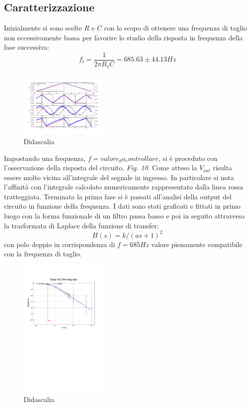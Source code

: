 \documentclass[journal]{IEEEtran}
\begin{document}
\subsection{\textbf{Caratterizzazione}}
Inizialmente si sono scelte $R$ e $C$ con lo scopo di ottenere una frequenza di taglio non eccessivamente bassa per favorire lo studio della risposta in frequenza della fase successiva: \[f_{t} = \frac{1}{2 \pi R_{1} C}= 685.63 \pm 44.13 Hz\] 

\begin{figure}[H]%
\begin {center}
\includegraphics[width=0.38\textwidth]{analysis/output/OPA-integ-with-res.pdf}
\caption{Didascalia}
\label{fig:oscilloscope}
\end {center}
\end{figure}
Impostando una frequenza, $f=valore_da _controllare$, si è proceduto con l'osservazione della risposta del circuito, \textit{Fig. 10}. Come atteso la $V_{out}$ risulta essere molto vicina all'integrale del segnale in ingresso. In particolare si nota l'affinità con l'integrale calcolato numericamente rappresentato dalla linea rossa tratteggiata.
Terminata la prima fase si è passati all'analisi della output del circuito in funzione della frequenza. I dati sono stati graficati e fittati in primo luogo con la forma funzionale di un filtro passa basso e poi in seguito attraverso la trasformata di Laplace della funzione di transfer: \[H(s)=k/(as+1)^2\] con polo doppio in corrispondenza di $f=685 Hz$ valore pienamente compatibile con la frequenza di taglio.
\begin{figure}[H]%
\begin {center}
\includegraphics[width=0.38\textwidth]{analysis/output/OPA-integrator_bode(mag).pdf}
\caption{Didascalia}
\label{fig:oscilloscope}
\end {center}
\end{figure}
\end{document}
